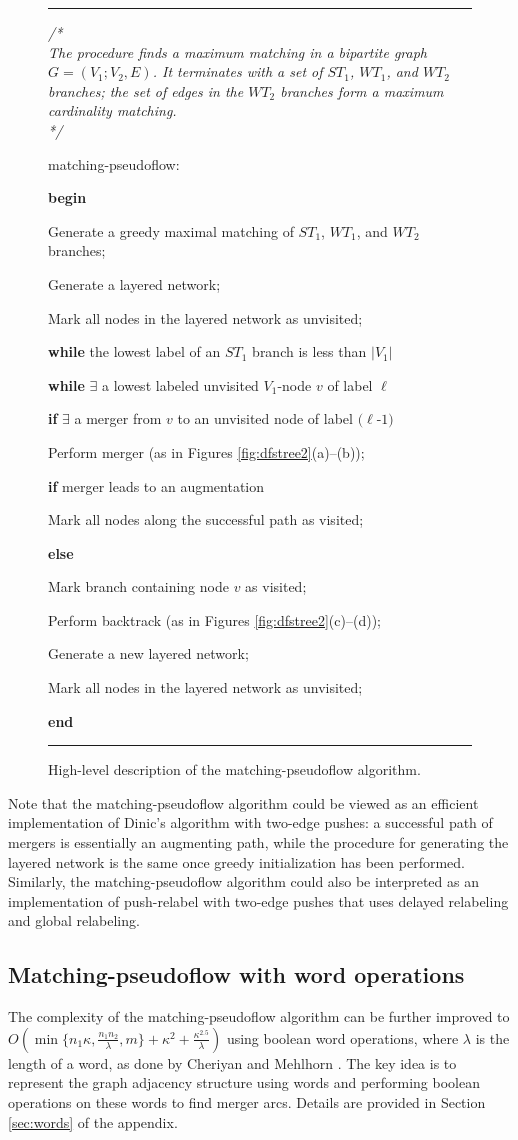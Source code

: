 \documentclass{article}
\newcounter{gap}
\newcommand{\n}{

\noindent \hspace{\thegap em}
}
\newcommand{\Procedure}{\noindent {\bf procedure }\addtocounter{gap}{2}}
\newcommand{\If}{{\bf if }}
\newcommand{\Begin}{{\bf begin}  \addtocounter{gap}{2}}
\newcommand{\Else}{{\bf else }}
\newcommand{\Do}{\addtocounter{gap}{2}{\bf do}}
\newcommand{\While}{{\bf while }}
\newcommand{\End}{{\bf end}}
\newcommand{\Comment}[1]{
{\it 
/*\\
\hspace{2em}#1\\
*/} \medskip
}
\newcommand{\EndLoop}{\addtocounter{gap}{-2}}
\newcommand{\algfigure}[4]{
\setcounter{gap}{0}
\renewcommand{\baselinestretch}{0.9}
\begin{figure}[#2]
\begin{center}
\rule{#1 \linewidth}{2.5pt}
\parbox{#1 \linewidth}{
\medskip
#3
\medskip
}
\rule{#1 \linewidth}{1.5pt}
\end{center}
\caption{#4}
\end{figure}
\renewcommand{\baselinestretch}{1.11111111111111111111111111111111}
}
\begin{document}
\algfigure{0.9}{htb}{ \Comment{The procedure finds a maximum matching in a bipartite graph $G = (V_1; V_2, E)$. It terminates with a set of $ST_1$, $WT_1$, and $WT_2$ branches; the set of edges in the $WT_2$ branches form a maximum cardinality matching.}\n
\Procedure matching-pseudoflow: \n
    \Begin \n
    Generate a greedy maximal matching of $ST_1$, $WT_1$, and $WT_2$ branches; \n
    Generate a layered network; \n
    Mark all nodes in the layered network as unvisited; \n
    \While the lowest label of an $ST_1$ branch is less than $|V_1|$ \Do \n
        \While $\exists$ a lowest labeled unvisited $V_1$-node $v$ of label $\ell$ \Do \n
            \If $\exists$ a merger from $v$ to an unvisited node of label $(\ell$-$1)$ \Do \n
                Perform merger (as in Figures \ref{fig:dfstree2}(a)--(b)); \n
                \If merger leads to an augmentation \Do \n
                    Mark all nodes along the successful path as visited; \EndLoop \EndLoop \n
            \Else \Do \n
                Mark branch containing node $v$ as visited; \n
                Perform backtrack (as in Figures \ref{fig:dfstree2}(c)--(d)); \EndLoop \EndLoop \n
        Generate a new layered network; \n
        Mark all nodes in the layered network as unvisited; \EndLoop \EndLoop \n
    \End \EndLoop
}{\label{algFigure:matchingPseudoflow}High-level description of the {\sf matching-pseudoflow} algorithm.}

Note that the {\sf matching-pseudoflow} algorithm could be viewed as an efficient implementation of Dinic's algorithm with two-edge pushes: a successful path of mergers is essentially an augmenting path, while the procedure for generating the layered network is the same once greedy initialization has been performed.  Similarly, the {\sf matching-pseudoflow} algorithm could also be interpreted as an implementation of push-relabel with two-edge pushes that uses delayed relabeling and global relabeling.

\subsection{Matching-pseudoflow with word operations}

The complexity of the matching-pseudoflow algorithm can be further
improved to $O\left (\min \{n_1\kappa, \frac{n_1n_2}{\lambda}, m\} +
\kappa^2 + \frac{\kappa^{2.5}}{\lambda}\right )$ using boolean word
operations, where $\lambda$ is the length of a word, as done by Cheriyan and Mehlhorn \cite{CheM96}.  The key
idea is to represent the graph adjacency structure using words and
performing boolean operations on these words to find merger arcs.
Details are provided in Section \ref{sec:words} of the appendix.
\end{document}
